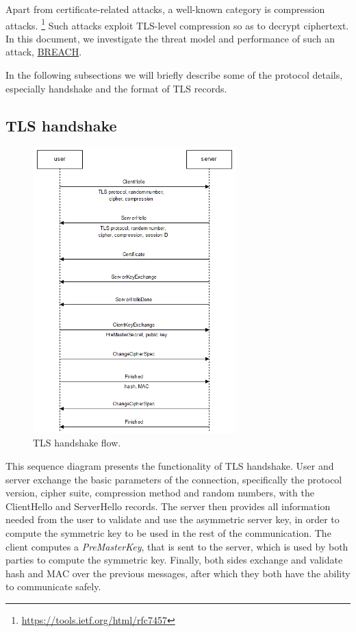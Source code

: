 Apart from certificate-related attacks, a well-known category is compression
attacks. \footnote{\url{https://tools.ietf.org/html/rfc7457}} Such attacks
exploit TLS-level compression so as to decrypt ciphertext. In this document, we
investigate the threat model and performance of such an attack,
\href{http://breachattack.com}{BREACH}.

In the following subsections we will briefly describe some of the protocol
details, especially handshake and the format of TLS records.

\subsection{TLS handshake}

\begin{figure}[H] \caption{TLS handshake flow.} \centering
\includegraphics[width=0.7\textwidth]{diagrams/tls_handshake.png}\end{figure}

This sequence diagram presents the functionality of TLS handshake. User and
server exchange the basic parameters of the connection, specifically the
protocol version, cipher suite, compression method and random numbers, with the
ClientHello and ServerHello records. The server then provides all information
needed from the user to validate and use the asymmetric server key, in order to
compute the symmetric key to be used in the rest of the communication. The
client computes a \textit{PreMasterKey}, that is sent to the server, which is
used by both parties to compute the symmetric key. Finally, both sides exchange
and validate hash and MAC over the previous messages, after which they both have
the ability to communicate safely.


